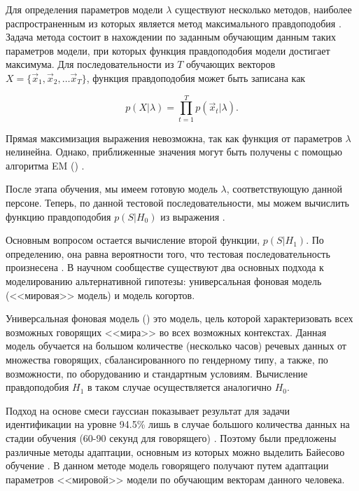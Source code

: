 Для определения параметров модели $\lambda$ существуют несколько методов, наиболее распространенным из которых является метод максимального правдоподобия \cite{BMSTUM17}. Задача метода состоит в нахождении по заданным обучающим данным таких параметров модели, при которых функция правдоподобия модели достигает максимума. Для последовательности из $T$ обучающих векторов $X = \{ \vec x_1, \vec x_2, \ldots \vec x_T \}$, функция правдоподобия может быть записана как

\begin{equation}
\label{eq:likelihood}
p(X | \lambda) = \prod_{t=1}^T p(\vec x_t | \lambda).
\end{equation}

Прямая максимизация выражения  невозможна, так как функция от параметров $\lambda$ нелинейна. Однако, приближенные значения могут быть получены с помощью алгоритма EM () \cite{Dempster77EM}.

После этапа обучения, мы имеем готовую модель $\lambda$, соответствующую данной персоне. Теперь, по данной тестовой последовательности, мы можем вычислить функцию правдоподобия $p(S|H_0)$ из выражения .

Основным вопросом остается вычисление второй функции, $p(S|H_1)$. По определению, она равна вероятности того, что тестовая последовательность произнесена . В научном сообществе существуют два основных подхода к моделированию альтернативной гипотезы: универсальная фоновая модель (<<мировая>> модель) и модель когортов.

Универсальная фоновая модель () это модель, цель которой характеризовать всех возможных говорящих <<мира>> во всех возможных контекстах. Данная модель обучается на большом количестве (несколько часов) речевых данных от множества говорящих, сбалансированного по гендерному типу, а также, по возможности, по оборудованию и стандартным условиям. Вычисление правдоподобия $H_1$ в таком случае осуществляется аналогично $H_0$.


Подход на основе смеси гауссиан показывает результат для задачи идентификации на уровне 94.5\% лишь в случае большого количества данных на стадии обучения (60-90 секунд для говорящего) \cite{Reynolds95gmm}. Поэтому были предложены различные методы адаптации, основным из которых можно выделить Байесово обучение \cite{Reynolds00speakerverification}. В данном методе модель говорящего получают путем адаптации параметров <<мировой>> модели по обучающим векторам данного человека.

